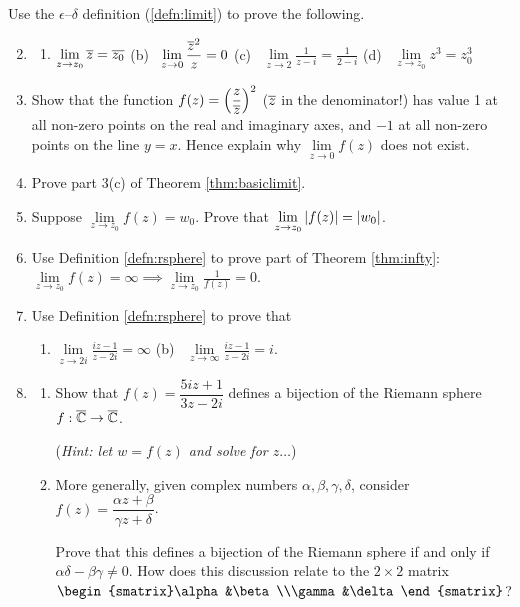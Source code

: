 \begin{exercises*}{}{}
	\exstart Use the $\epsilon$--$\delta$ definition (\ref{defn:limit}) to prove the following.
	\begin{enumerate}\setcounter{enumi}{1}
	  \item[]\begin{enumerate}
	  	\item $\displaystyle\lim\limits_{z\to z_0}\overline{z}=\overline{z_0}$\qquad
	  	(b) \ $\displaystyle\lim\limits_{z\to 0}\frac{\overline{z}^2}z=0$\qquad
	  	(c) \ $\displaystyle\lim\limits_{z\to 2}\frac 1{z-i}=\frac 1{2-i}$\qquad
	  	(d) \ $\displaystyle\lim\limits_{z\to z_0}z^3=z_0^3$
	  \end{enumerate}
	  
	  
	  \item Show that the function $f(z)=\left(\dfrac z{\overline{z}}\right)^2$ ($\overline{z}$ in the denominator!) has value 1 at all non-zero points on the real and imaginary axes, and $-1$ at all non-zero points on the line $y=x$. Hence explain why $\lim\limits_{z\to 0}f(z)$ does not exist.
	  
	  
	  \item Prove part 3(c) of Theorem \ref{thm:basiclimit}.
	  
	  
	  \item Suppose $\lim\limits_{z\to z_0}f(z)=w_0$. Prove that $\lim\limits_{z\to z_0}\left| f(z)\right|=\left| w_0\right|$.
	   
	   
	  \item Use Definition \ref{defn:rsphere} to prove part of Theorem \ref{thm:infty}: $\lim\limits_{z\to z_0}f(z)=\infty \implies \lim\limits_{z\to z_0}\frac 1{f(z)}=0$.
	  
	  
	  \item Use Definition \ref{defn:rsphere} to prove that
	  \begin{enumerate}
	    \item $\displaystyle\lim\limits_{z\to 2i}\frac{iz-1}{z-2i}=\infty$ \qquad (b) \ $\displaystyle\lim\limits_{z\to\infty}\frac{iz-1}{z-2i}=i$.
	  \end{enumerate}
	  
	  
	 	\item\begin{enumerate}
	    \item Show that $f(z)=\dfrac{5iz+1}{3z-2i}$ defines a bijection of the Riemann sphere $f:\overline{\mathbb{C}}\to\overline{\mathbb{C}}$.\par
	  	(\emph{Hint: let $w=f(z)$ and solve for $z\ldots$})
	  	
	  	\item More generally, given complex numbers $\alpha,\beta,\gamma,\delta$, consider $f(z)=\dfrac{\alpha z+\beta}{\gamma z+\delta}$.\par
	  	Prove that this defines a bijection of the Riemann sphere if and only if $\alpha\delta-\beta\gamma\neq 0$. How does this discussion relate to the $2\times 2$ matrix $\begin{smatrix}\alpha&\beta\\\gamma&\delta\end{smatrix}$?
	  \end{enumerate}
	  

\end{enumerate}
\end{exercises*}
